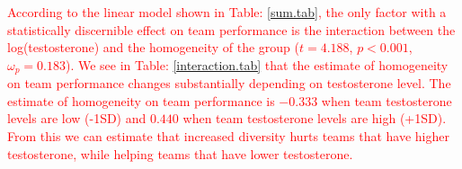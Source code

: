 \documentclass{article}\usepackage[]{graphicx}\usepackage[]{xcolor}
\begin{document}
\begin{enumerate}
\begin{enumerate}
\textcolor{red}{According to the linear model shown in Table: \ref{sum.tab}, the only factor with a statistically discernible effect on team performance is the interaction between the log(testosterone) and the homogeneity of the group ($t = 4.188$, $p < 0.001$, $\omega_{p} = 0.183$). We see in Table: \ref{interaction.tab} that the estimate of homogeneity on team performance changes substantially depending on testosterone level. The estimate of homogeneity on team performance is $-0.333$ when team testosterone levels are low (-1SD) and $0.440$ when team testosterone levels are high (+1SD). From this we can estimate that increased diversity hurts teams that have higher testosterone, while helping teams that have lower testosterone.}
      
      
  \end{enumerate}
  
\end{enumerate}

\end{document}
